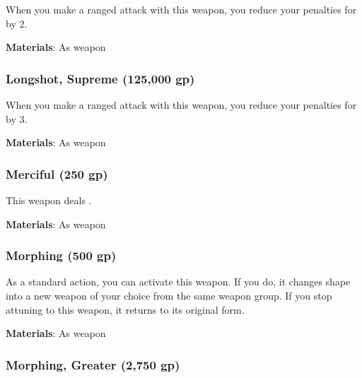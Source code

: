 When you make a ranged attack with this weapon, you reduce your penalties for  by 2.



\vspace{0.25em}
\textbf{Materials}: As weapon


\lowercase{\hypertarget{item:Longshot, Supreme}{}}\label{item:Longshot, Supreme}
\hypertarget{item:Longshot, Supreme}{\subsubsection{Longshot, Supreme\hfill{} (125,000 gp)}}

When you make a ranged attack with this weapon, you reduce your penalties for  by 3.



\vspace{0.25em}
\textbf{Materials}: As weapon


\lowercase{\hypertarget{item:Merciful}{}}\label{item:Merciful}
\hypertarget{item:Merciful}{\subsubsection{Merciful\hfill{} (250 gp)}}

This weapon deals .



\vspace{0.25em}
\textbf{Materials}: As weapon


\lowercase{\hypertarget{item:Morphing}{}}\label{item:Morphing}
\hypertarget{item:Morphing}{\subsubsection{Morphing\hfill{} (500 gp)}}

As a standard action, you can activate this weapon.
If you do, it changes shape into a new weapon of your choice from the same weapon group.
If you stop attuning to this weapon, it returns to its original form.



\vspace{0.25em}
\textbf{Materials}: As weapon


\lowercase{\hypertarget{item:Morphing, Greater}{}}\label{item:Morphing, Greater}
\hypertarget{item:Morphing, Greater}{\subsubsection{Morphing, Greater\hfill{} (2,750 gp)}}


